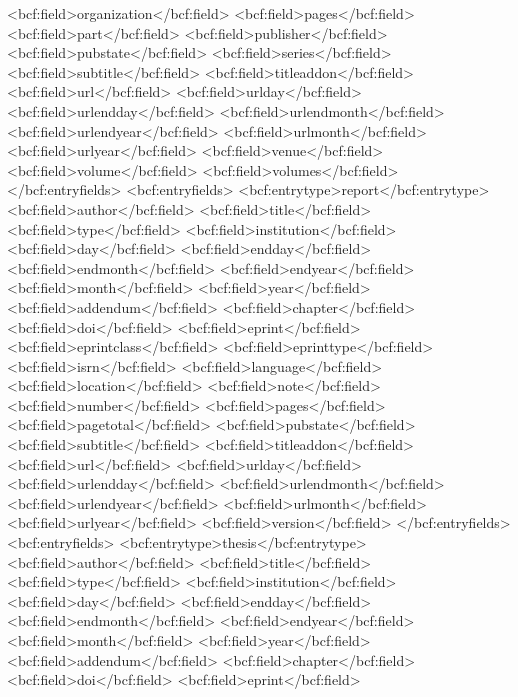       <bcf:field>organization</bcf:field>
      <bcf:field>pages</bcf:field>
      <bcf:field>part</bcf:field>
      <bcf:field>publisher</bcf:field>
      <bcf:field>pubstate</bcf:field>
      <bcf:field>series</bcf:field>
      <bcf:field>subtitle</bcf:field>
      <bcf:field>titleaddon</bcf:field>
      <bcf:field>url</bcf:field>
      <bcf:field>urlday</bcf:field>
      <bcf:field>urlendday</bcf:field>
      <bcf:field>urlendmonth</bcf:field>
      <bcf:field>urlendyear</bcf:field>
      <bcf:field>urlmonth</bcf:field>
      <bcf:field>urlyear</bcf:field>
      <bcf:field>venue</bcf:field>
      <bcf:field>volume</bcf:field>
      <bcf:field>volumes</bcf:field>
    </bcf:entryfields>
    <bcf:entryfields>
      <bcf:entrytype>report</bcf:entrytype>
      <bcf:field>author</bcf:field>
      <bcf:field>title</bcf:field>
      <bcf:field>type</bcf:field>
      <bcf:field>institution</bcf:field>
      <bcf:field>day</bcf:field>
      <bcf:field>endday</bcf:field>
      <bcf:field>endmonth</bcf:field>
      <bcf:field>endyear</bcf:field>
      <bcf:field>month</bcf:field>
      <bcf:field>year</bcf:field>
      <bcf:field>addendum</bcf:field>
      <bcf:field>chapter</bcf:field>
      <bcf:field>doi</bcf:field>
      <bcf:field>eprint</bcf:field>
      <bcf:field>eprintclass</bcf:field>
      <bcf:field>eprinttype</bcf:field>
      <bcf:field>isrn</bcf:field>
      <bcf:field>language</bcf:field>
      <bcf:field>location</bcf:field>
      <bcf:field>note</bcf:field>
      <bcf:field>number</bcf:field>
      <bcf:field>pages</bcf:field>
      <bcf:field>pagetotal</bcf:field>
      <bcf:field>pubstate</bcf:field>
      <bcf:field>subtitle</bcf:field>
      <bcf:field>titleaddon</bcf:field>
      <bcf:field>url</bcf:field>
      <bcf:field>urlday</bcf:field>
      <bcf:field>urlendday</bcf:field>
      <bcf:field>urlendmonth</bcf:field>
      <bcf:field>urlendyear</bcf:field>
      <bcf:field>urlmonth</bcf:field>
      <bcf:field>urlyear</bcf:field>
      <bcf:field>version</bcf:field>
    </bcf:entryfields>
    <bcf:entryfields>
      <bcf:entrytype>thesis</bcf:entrytype>
      <bcf:field>author</bcf:field>
      <bcf:field>title</bcf:field>
      <bcf:field>type</bcf:field>
      <bcf:field>institution</bcf:field>
      <bcf:field>day</bcf:field>
      <bcf:field>endday</bcf:field>
      <bcf:field>endmonth</bcf:field>
      <bcf:field>endyear</bcf:field>
      <bcf:field>month</bcf:field>
      <bcf:field>year</bcf:field>
      <bcf:field>addendum</bcf:field>
      <bcf:field>chapter</bcf:field>
      <bcf:field>doi</bcf:field>
      <bcf:field>eprint</bcf:field>
